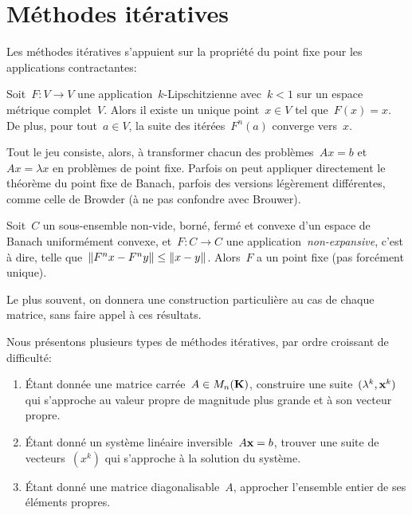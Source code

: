 \clearpage
\section{Méthodes itératives}

Les méthodes itératives s'appuient sur la propriété du point fixe pour
les applications contractantes:

\begin{proposition}
	Soit~$F:V\to V$ une application~$k$-Lipschitzienne avec~$k<1$ sur un espace
	métrique complet~$V$.  Alors il existe un unique point~$x\in V$ tel
	que~$F(x)=x$.  De plus, pour tout~$a\in V$, la suite des itérées~$F^n(a)$
	converge vers~$x$.
\end{proposition}

Tout le jeu consiste, alors, à transformer chacun des problèmes~$Ax=b$
et~$Ax=\lambda x$ en problèmes de point fixe.  Parfois on peut appliquer
directement le théorème du point fixe de Banach, parfois des versions
légèrement différentes, comme celle de Browder (à ne pas confondre avec
Brouwer).


\begin{proposition}
	Soit~$C$ un sous-ensemble non-vide, borné, fermé et convexe d'un espace de
	Banach uniformément convexe, et~$F:C\to C$ une
	application~\emph{non-expansive}, c'est à dire,
	telle que~$\left\|F^nx-F^ny\right\|\le \left\|x-y\right\|$.  Alors~$F$ a un point fixe (pas
	forcément unique).  %
\end{proposition}

Le plus souvent, on donnera une construction particulière au cas de chaque
matrice, sans faire appel à ces résultats.


Nous présentons plusieurs types de méthodes itératives, par ordre croissant de
difficulté:
\begin{enumerate}
	\item Étant donnée une matrice carrée~$A\in M_n(\mathbf{K})$, construire une
		suite~$(\lambda^k,\mathbf{x}^k)$ qui s'approche au valeur propre de magnitude
		plus grande et à son vecteur propre.
	\item Étant donné un système linéaire inversible~$A\mathbf{x}=b$, trouver une
		suite de vecteurs~$(x^k)$ qui s'approche à la solution du système.
	\item Étant donné une matrice diagonalisable~$A$, approcher l'ensemble
		entier de ses éléments propres.
\end{enumerate}


